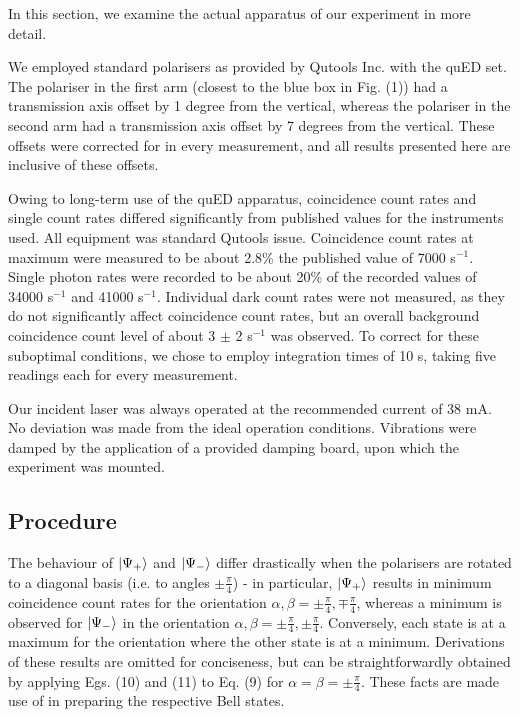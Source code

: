 \documentclass[aps,prl,nofootinbib,twocolumn,superscriptaddress,groupedaddress]{revtex4}  %
\begin{document}
In this section, we examine the actual apparatus of our experiment in more detail. 

We employed standard polarisers as provided by Qutools Inc. with the quED set. The polariser in the first arm (closest to the blue box in Fig. (1)) had a transmission axis offset by 1 degree from the vertical, whereas the polariser in the second arm had a transmission axis offset by 7 degrees from the vertical. These offsets were corrected for in every measurement, and all results presented here are inclusive of these offsets.

Owing to long-term use of the quED apparatus, coincidence count rates and single count rates differed significantly from published values\cite{qued} for the instruments used. All equipment was standard Qutools issue. Coincidence count rates at maximum were measured to be about 2.8\% the published value of 7000 s$^{-1}$. Single photon rates were recorded to be about 20\% of the recorded values of 34000 s$^{-1}$ and 41000 s$^{-1}$. Individual dark count rates were not measured, as they do not significantly affect coincidence count rates, but an overall background coincidence count level of about 3 $\pm$ 2 s$^{-1}$ was observed. To correct for these suboptimal conditions, we chose to employ integration times of 10 s, taking five readings each for every measurement. 

Our incident laser was always operated at the recommended current of 38 mA. No deviation was made from the ideal operation conditions. Vibrations were damped by the application of a provided damping board, upon which the experiment was mounted.

\subsection{Procedure}
The behaviour of $\ket{\Psi_{+}}$ and $\ket{\Psi_{-}}$ differ drastically when the polarisers are rotated to a diagonal basis (i.e. to angles $\pm\frac{\pi}{4}$) - in particular, $\ket{\Psi_{+}}$ results in minimum coincidence count rates for the orientation $\alpha, \beta = \pm \frac{\pi}{4}, \mp \frac{\pi}{4}$, whereas a minimum is observed for $\ket{\Psi_{-}}$ in the orientation $\alpha, \beta = \pm \frac{\pi}{4}, \pm \frac{\pi}{4}$. Conversely, each state is at a maximum for the orientation where the other state is at a minimum. Derivations of these results are omitted for conciseness, but can be straightforwardly obtained by applying Egs. (10) and (11) to Eq. (9) for $\alpha = \beta = \pm \frac{\pi}{4}$. These facts are made use of in preparing the respective Bell states. 
\end{document}
